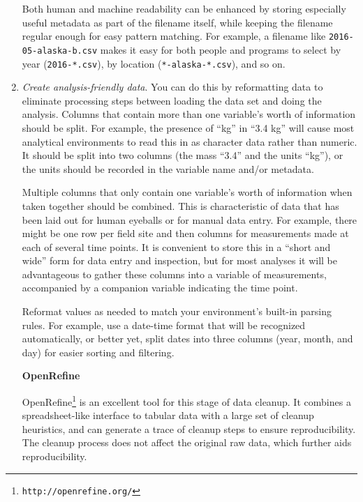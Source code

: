 \documentclass[10pt]{article}
\newcommand{\recommend}[1]{\textit{#1}}
\newcommand{\withurl}[2]{{#1}\footnote{\texttt{#2}}}
\begin{document}
\begin{enumerate}
  Both human and machine readability can be enhanced by storing
  especially useful metadata as part of the filename itself, while
  keeping the filename regular enough for easy pattern matching. For
  example, a filename like \texttt{2016-05-alaska-b.csv} makes it easy
  for both people and programs to select by year
  (\texttt{2016-*.csv}), by location (\texttt{*-alaska-*.csv}), and so
  on.

\item
  \recommend{Create analysis-friendly data}.  You can do this by
  reformatting data to eliminate processing steps between loading the
  data set and doing the analysis.
  Columns that contain more than one variable's worth of information
  should be split. For example, the presence of ``kg'' in ``3.4 kg''
  will cause most analytical environments to read this in as character
  data rather than numeric. It should be split into two columns (the
  mass ``3.4'' and the units ``kg''), or the units should be recorded
  in the variable name and/or metadata.

  Multiple columns that only contain one variable's worth of information
  when taken together should be combined. This is characteristic of data
  that has been laid out for human eyeballs or for manual data entry.
  For example, there might be one row per field site and then columns
  for measurements made at each of several time points. It is convenient
  to store this in a ``short and wide'' form for data entry and
  inspection, but for most analyses it will be advantageous to gather
  these columns into a variable of measurements, accompanied by a
  companion variable indicating the time point.

  Reformat values as needed to match your environment's built-in
  parsing rules. For example, use a date-time format that will be
  recognized automatically, or better yet, split dates into three
  columns (year, month, and day) for easier sorting and filtering.

  \begin{framed}
    \noindent \textbf{OpenRefine}

    \withurl{OpenRefine}{http://openrefine.org/} is an excellent tool
    for this stage of data cleanup. It combines a spreadsheet-like
    interface to tabular data with a large set of cleanup heuristics,
    and can generate a trace of cleanup steps to ensure
    reproducibility.  The cleanup process does not affect the original
    raw data, which further aids reproducibility.
  \end{framed}


\end{enumerate}
\end{document}
